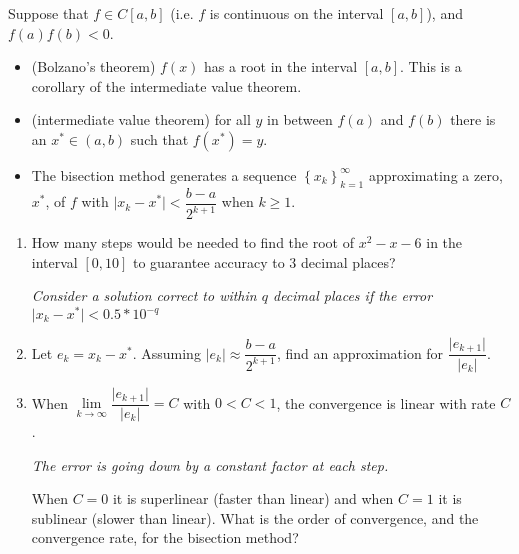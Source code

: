 \documentclass[12pt,letterpaper,noanswers]{exam}
\begin{document}
\begin{tcolorbox}
Suppose that $f\in C[a,b]$ (i.e. $f$ is continuous on the interval $[a,b]$), and $f(a)f(b)<0$.
\begin{itemize}
\itemsep0pt
    \item (Bolzano's theorem) $f(x)$ has a root in the interval $[a,b]$.  This is a corollary of the intermediate value theorem.
    \end{itemize}
\end{tcolorbox}
\begin{tcolorbox}
\begin{itemize}
    \item (intermediate value theorem) for all $y$ in between $f(a)$ and $f(b)$ there is an $x^*\in(a,b)$ such that $f(x^*) = y$.

    \item The bisection method generates a sequence $\left\{x_k\right\}_{k=1}^\infty$ approximating a zero, $x^*$, of $f$ with $\vert x_k - x^*\vert < \dfrac{b-a}{2^{k+1}}$ when $k\geq 1$.
\end{itemize}
\end{tcolorbox}
\begin{enumerate}[resume=classQ]
    \item How many steps would be needed to find the root of $x^2-x-6$ in the interval $[0,10]$ to guarantee accuracy to $3$ decimal places?  
    


\emph{Consider a solution correct to within $q$ decimal places if the error $\vert x_k - x^*\vert < 0.5*10^{-q}$}
\vspace{1in}


    \item Let $e_k = x_k - x^*$.  Assuming $\vert e_k \vert \approx\dfrac{b-a}{2^{k+1}}$, find an approximation for $\dfrac{ \vert e_{k+1} \vert}{ \vert e_k \vert}.$
        \vspace{1in}
        
    \item When $\lim\limits_{k\rightarrow\infty} \dfrac{ \vert e_{k+1} \vert}{ \vert e_k \vert} = C$ with $0<C<1$, the convergence is linear with rate $C$.  
    
    \emph{The error is going down by a constant factor at each step.}
    
    When $C = 0$ it is superlinear (faster than linear) and when $C = 1$ it is sublinear (slower than linear).  
What is the order of convergence, and the convergence rate, for the bisection method?

\vspace{0.5in}

\end{enumerate}
\end{document}

